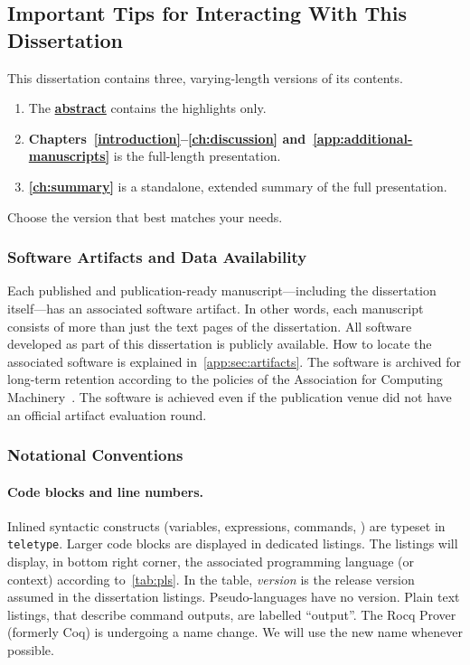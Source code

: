 \subsection{Important Tips for Interacting With This Dissertation}
\label{subsec:tips}

This dissertation contains three, varying-length versions of its contents.

\begin{mdframed}[backgroundcolor=paperbase,linecolor=paper]
\begin{enumerate}[wide, labelwidth=!, labelindent=0pt]
\item The \textbf{\hyperref[abs]{abstract}} contains the highlights only.
\item \textbf{Chapters~\ref{introduction}--\ref{ch:discussion} and~\ref{app:additional-manuscripts}} is the full-length presentation.
\item \textbf{\autoref{ch:summary}} is a standalone, extended summary of the full presentation.
\end{enumerate}
\end{mdframed}

Choose the version that best matches your needs.

\subsubsection{Software Artifacts and Data Availability}

Each published and publication-ready manuscript---including the dissertation itself---has an associated software artifact.
In other words, each manuscript consists of more than just the text pages of the dissertation.
All software developed as part of this dissertation is publicly available.
How to locate the associated software is explained in~\autoref{app:sec:artifacts}.
The software is archived for long-term retention according to the policies of the Association for Computing Machinery~\cite{acm_badging}.
The software is achieved even if the publication venue did not have an official artifact evaluation round.

\subsubsection{Notational Conventions}

\paragraph*{Code blocks and line numbers.}
Inlined syntactic constructs (variables, expressions, commands, \etc) are typeset in \texttt{teletype}.
Larger code blocks are displayed in dedicated listings.
The listings will display, in bottom right corner, the associated programming language (or context) according to~\autoref{tab:pls}.
In the table, \emph{version} is the release version assumed in the dissertation listings.
Pseudo-languages have no version.
Plain text listings, that describe command outputs, are labelled \enquote{output}.
The Rocq Prover (formerly Coq) is undergoing a name change.
We will use the new name whenever possible.

